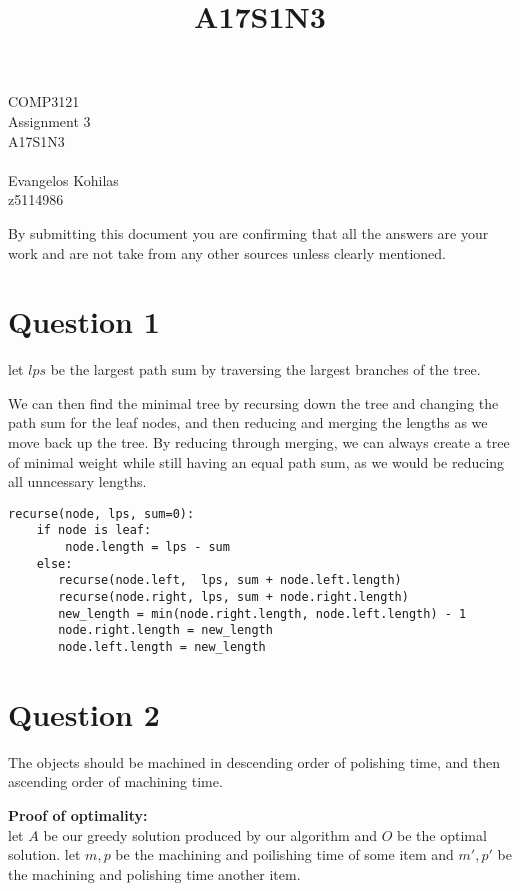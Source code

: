 \documentclass{article}
\title{A17S1N3}
\begin{document}
\begin{center}
    \begin{LARGE}
        COMP3121\\
        Assignment 3\\
        A17S1N3\\
        \hrulefill\\
        Evangelos Kohilas\\
        z5114986\\
        \hrulefill
    \end{LARGE}

    \begin{large}
        By submitting this document you are confirming that all the answers are your work and are not take from any other sources unless clearly mentioned.
    \end{large}

\end{center}

\section*{Question 1}
let $lps$ be the largest path sum by traversing the largest branches of the tree.

We can then find the minimal tree by recursing down the tree and changing the path sum for the leaf nodes, and then reducing and merging the lengths as we move back up the tree. By reducing through merging, we can always create a tree of minimal weight while still having an equal path sum, as we would be reducing all unncessary lengths.

\begin{verbatim}
recurse(node, lps, sum=0):
    if node is leaf:
        node.length = lps - sum
    else:
       recurse(node.left,  lps, sum + node.left.length)
       recurse(node.right, lps, sum + node.right.length)
       new_length = min(node.right.length, node.left.length) - 1
       node.right.length = new_length
       node.left.length = new_length
\end{verbatim}

\section*{Question 2}
The objects should be machined in descending order of polishing time, and then ascending order of machining time.

\textbf{Proof of optimality:}\\
let $A$ be our greedy solution produced by our algorithm and $O$ be the optimal solution.
let $m, p$ be the machining and poilishing time of some item and $m', p'$ be the machining and polishing time another item.
\end{document}

